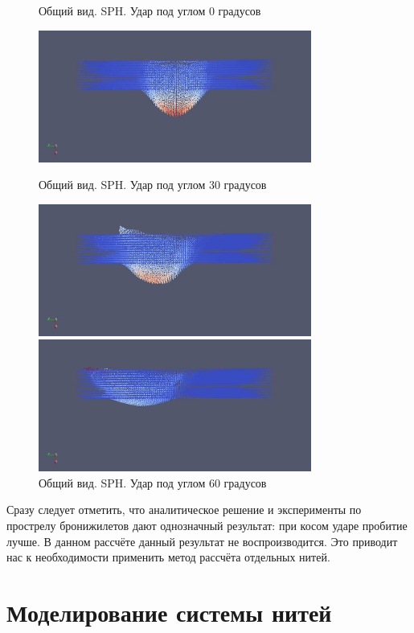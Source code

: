 \begin{figure}[H]
    \centering

    \caption{Общий вид. SPH. Удар под углом 0 градусов}
    \includegraphics[width=0.8\textwidth]{img/sph_0.png}

    \caption{Общий вид. SPH. Удар под углом 30 градусов}
    \includegraphics[width=0.8\textwidth]{img/sph_30.png}

    \caption{Общий вид. SPH. Удар под углом 60 градусов}
    \includegraphics[width=0.8\textwidth]{img/sph_60.png}
\end{figure}

Сразу следует отметить, что аналитическое решение и эксперименты по прострелу бронижилетов дают однозначный результат:
при косом ударе пробитие лучше.
В данном рассчёте данный результат не воспроизводится.
Это приводит нас к необходимости применить метод рассчёта отдельных нитей.

\section*{}

\section*{Моделирование системы нитей}
